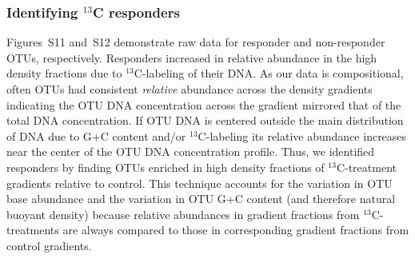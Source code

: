 \documentclass{article}
\begin{document}
\subsubsection{Identifying $^{13}$C responders} 
Figures~S11 and~S12 demonstrate raw data for responder and non-responder OTUs,
respectively. Responders increased in relative abundance in the high density fractions
due to $^{13}$C-labeling of their DNA. As our data is compositional, often OTUs
had consistent \textit{relative} abundance across the density gradients indicating the
OTU DNA concentration across the gradient mirrored that of the total DNA concentration. If OTU
DNA is centered outside the main distribution of DNA due to G$+$C content
and/or $^{13}$C-labeling its relative abundance increases near the center of the OTU DNA
concentration profile. Thus, we identified responders by finding OTUs
enriched in high density fractions of $^{13}$C-treatment gradients relative to
control. This technique accounts for the variation in OTU base abundance and
the variation in OTU G$+$C content (and therefore natural buoyant density)
because relative abundances in gradient fractions from $^{13}$C-treatments are
always compared to those in corresponding gradient fractions from control
gradients.  
\end{document}

